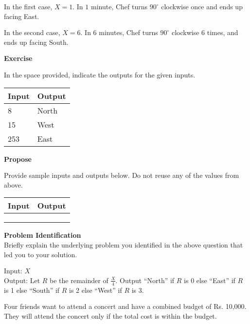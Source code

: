 \documentclass[a4paper]{exam}
\newcommand\heading[1]{\textbf{#1}}
\begin{document}
\begin{questions}
    In the first case, $X=1$. In $1$ minute, Chef turns $90^\circ$ clockwise once and ends up facing East.

    In the second case, $X=6$. In $6$ minutes, Chef turns $90^\circ$ clockwise 6 times, and ends up facing South.

    \heading{Exercise}

    In the space provided, indicate the outputs for the given inputs.

    \begin{tabularx}{\textwidth}{|X|X|}
        \rowcolor{gray!50}
        \hline
        Input & Output \\ \hline\hline
        8     & North  \\\hline
        15    & West   \\\hline
        253   & East   \\\hline
    \end{tabularx}

    \heading{Propose}

    Provide sample inputs and outputs below. Do not reuse any of the values from above.

    \begin{tabularx}{\textwidth}{|X|X|}
        \rowcolor{gray!50}
        \hline
        Input & Output \\ \hline\hline
              &        \\\hline
              &        \\\hline
              &        \\\hline
    \end{tabularx}

    \heading{Problem Identification}\\
    Briefly explain the underlying problem you identified in the above question that led you to your solution.

  \begin{mdframed}
    Input: $X$\\
    Output: Let $R$ be the remainder of $\frac{X}{4}$. Output ``North'' if $R$ is 0 else ``East'' if $R$ is 1 else ``South'' if $R$ is 2 else ``West'' if $R$ is 3.
  \end{mdframed}


    Four friends want to attend a concert and have a combined budget of Rs. 10,000. They will attend the concert only if the total cost is within the budget.


\end{questions}
\end{document}

